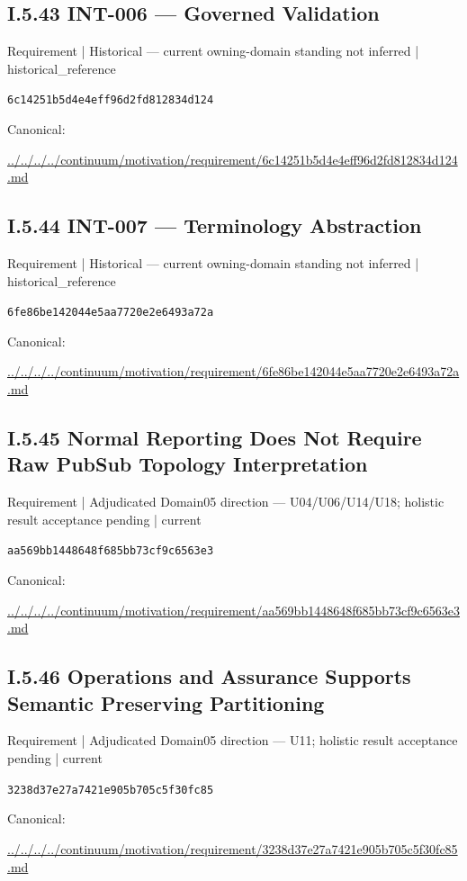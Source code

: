 \documentclass[10pt,a4paper]{article}
\begin{document}
\subsection*{I.5.43 INT-006 — Governed Validation}
{\small Requirement | Historical — current owning-domain standing not inferred | historical\_reference}\par
\texttt{6c14251b5d4e4eff96d2fd812834d124}\par
Canonical: \par
{\footnotesize\url{../../../../continuum/motivation/requirement/6c14251b5d4e4eff96d2fd812834d124.md}}\par
\subsection*{I.5.44 INT-007 — Terminology Abstraction}
{\small Requirement | Historical — current owning-domain standing not inferred | historical\_reference}\par
\texttt{6fe86be142044e5aa7720e2e6493a72a}\par
Canonical: \par
{\footnotesize\url{../../../../continuum/motivation/requirement/6fe86be142044e5aa7720e2e6493a72a.md}}\par
\subsection*{I.5.45 Normal Reporting Does Not Require Raw PubSub Topology Interpretation}
{\small Requirement | Adjudicated Domain05 direction — U04/U06/U14/U18; holistic result acceptance pending | current}\par
\texttt{aa569bb1448648f685bb73cf9c6563e3}\par
Canonical: \par
{\footnotesize\url{../../../../continuum/motivation/requirement/aa569bb1448648f685bb73cf9c6563e3.md}}\par
\subsection*{I.5.46 Operations and Assurance Supports Semantic Preserving Partitioning}
{\small Requirement | Adjudicated Domain05 direction — U11; holistic result acceptance pending | current}\par
\texttt{3238d37e27a7421e905b705c5f30fc85}\par
Canonical: \par
{\footnotesize\url{../../../../continuum/motivation/requirement/3238d37e27a7421e905b705c5f30fc85.md}}\par
\end{document}
